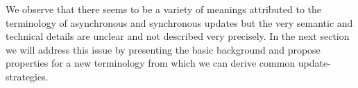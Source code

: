 \medskip

We observe that there seems to be a variety of meanings attributed to the terminology of asynchronous and synchronous updates but the very semantic and technical details are unclear and not described very precisely. In the next section we will address this issue by presenting the basic background and propose properties for a new terminology from which we can derive common update-strategies.